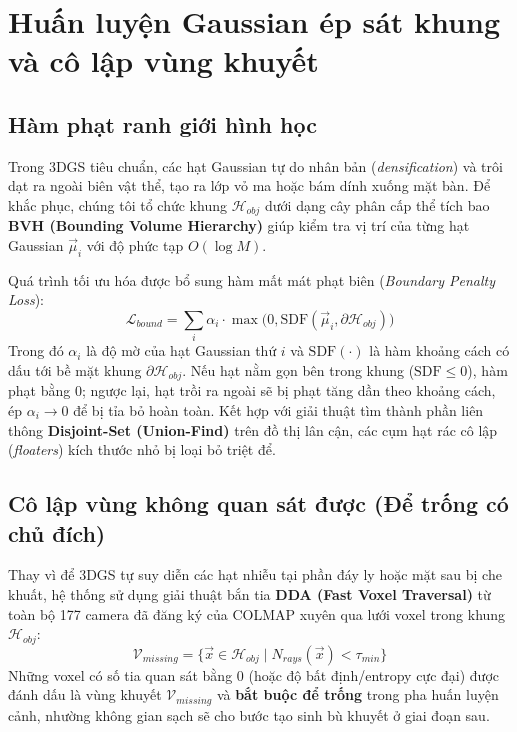 \section{Huấn luyện Gaussian ép sát khung và cô lập vùng khuyết}
\subsection{Hàm phạt ranh giới hình học}
Trong 3DGS tiêu chuẩn, các hạt Gaussian tự do nhân bản (\textit{densification}) và trôi dạt ra ngoài biên vật thể, tạo ra lớp vỏ ma hoặc bám dính xuống mặt bàn. Để khắc phục, chúng tôi tổ chức khung $\mathcal{H}_{obj}$ dưới dạng cây phân cấp thể tích bao \textbf{BVH (Bounding Volume Hierarchy)} giúp kiểm tra vị trí của từng hạt Gaussian $\vec{\mu}_i$ với độ phức tạp $O(\log M)$.

Quá trình tối ưu hóa được bổ sung hàm mất mát phạt biên (\textit{Boundary Penalty Loss}):
\begin{equation}
    \mathcal{L}_{bound} = \sum_{i} \alpha_i \cdot \max\Big(0, \text{SDF}(\vec{\mu}_i, \partial \mathcal{H}_{obj})\Big)
\end{equation}
Trong đó $\alpha_i$ là độ mờ của hạt Gaussian thứ $i$ và $\text{SDF}(\cdot)$ là hàm khoảng cách có dấu tới bề mặt khung $\partial \mathcal{H}_{obj}$. Nếu hạt nằm gọn bên trong khung ($\text{SDF} \le 0$), hàm phạt bằng 0; ngược lại, hạt trồi ra ngoài sẽ bị phạt tăng dần theo khoảng cách, ép $\alpha_i \to 0$ để bị tỉa bỏ hoàn toàn. Kết hợp với giải thuật tìm thành phần liên thông \textbf{Disjoint-Set (Union-Find)} trên đồ thị lân cận, các cụm hạt rác cô lập (\textit{floaters}) kích thước nhỏ bị loại bỏ triệt để.

\subsection{Cô lập vùng không quan sát được (Để trống có chủ đích)}
Thay vì để 3DGS tự suy diễn các hạt nhiễu tại phần đáy ly hoặc mặt sau bị che khuất, hệ thống sử dụng giải thuật bắn tia \textbf{DDA (Fast Voxel Traversal)} từ toàn bộ 177 camera đã đăng ký của COLMAP xuyên qua lưới voxel trong khung $\mathcal{H}_{obj}$:
\begin{equation}
    \mathcal{V}_{missing} = \{ \vec{x} \in \mathcal{H}_{obj} \mid N_{rays}(\vec{x}) < \tau_{min} \}
\end{equation}
Những voxel có số tia quan sát bằng 0 (hoặc độ bất định/entropy cực đại) được đánh dấu là vùng khuyết $\mathcal{V}_{missing}$ và \textbf{bắt buộc để trống} trong pha huấn luyện cảnh, nhường không gian sạch sẽ cho bước tạo sinh bù khuyết ở giai đoạn sau.
